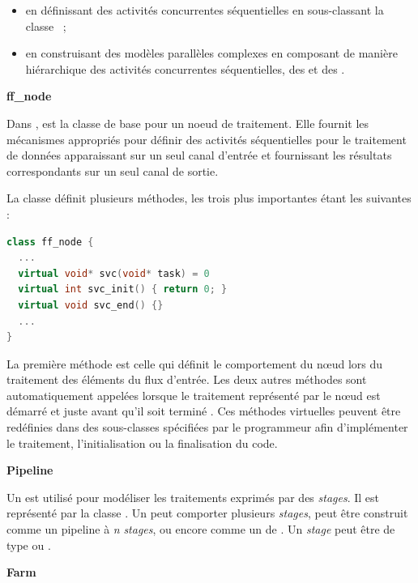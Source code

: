 \begin{itemize}
\item en d\'efinissant des activit\'es concurrentes s\'equentielles en sous-classant la classe ~;
 
\item en construisant des mod\`eles parall\`eles complexes en composant de mani\`ere hi\'erarchique des activit\'es concurrentes s\'equentielles, des  et des .
\end{itemize}

\textbf{ff\_node}

Dans ,  est la classe de base pour un noeud de traitement. Elle fournit les m\'ecanismes appropri\'es pour d\'efinir des activit\'es s\'equentielles pour le traitement de données apparaissant sur un seul canal d'entr\'ee et fournissant les r\'esultats correspondants sur un seul canal de sortie. 

La classe  d\'efinit plusieurs m\'ethodes, les trois plus importantes \'etant les suivantes :
\begin{lstlisting}[language=c++]
class ff_node {
  ...
  virtual void* svc(void* task) = 0
  virtual int svc_init() { return 0; } 
  virtual void svc_end() {} 
  ...
}
\end{lstlisting}

La premi\`ere m\'ethode est celle qui d\'efinit le comportement du nœud lors du traitement des \'el\'ements du flux d'entr\'ee. Les deux autres m\'ethodes sont automatiquement appel\'ees lorsque le traitement repr\'esent\'e par le nœud est d\'emarr\'e  et juste avant qu'il soit termin\'e . Ces m\'ethodes virtuelles peuvent \^etre red\'efinies dans des sous-classes  sp\'ecifi\'ees par le programmeur afin d'impl\'ementer le traitement, l'initialisation ou la finalisation du code.


\textbf{Pipeline}

Un  est utilis\'e pour mod\'eliser les traitements exprim\'es par des \emph{stages}. Il est repr\'esent\'e par la classe . Un  peut comporter plusieurs \emph{stages}, peut \^etre construit comme un pipeline \`a \emph{n} \emph{stages}, ou encore comme un  de . Un \emph{stage} peut \^etre de type  ou .


\goodbreak

\textbf{Farm}
\label{farm.sect}


